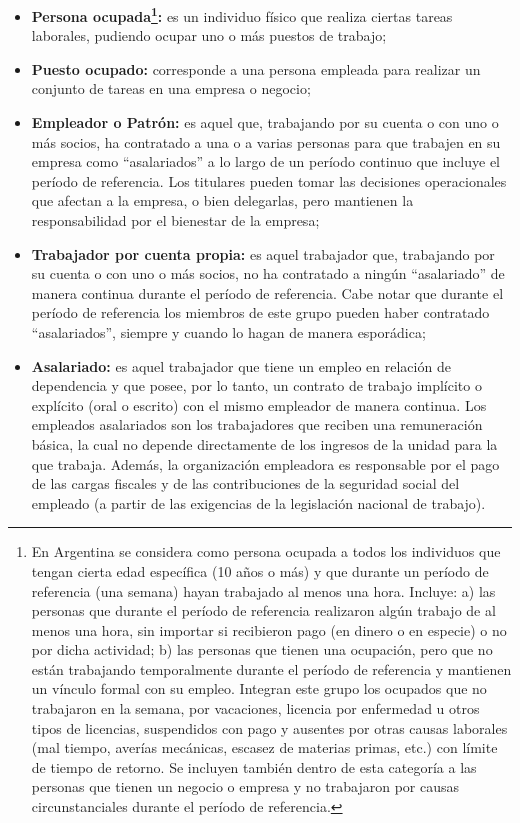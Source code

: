 \documentclass[
  openany]{book}
\begin{document}
\begin{itemize}
\item
  \textbf{Persona ocupada\footnote{En Argentina se considera como persona ocupada a todos los individuos que tengan cierta edad específica (10 años o más) y que durante un período de referencia (una semana) hayan trabajado al menos una hora. Incluye: a) las personas que durante el período de referencia realizaron algún trabajo de al menos una hora, sin importar si recibieron pago (en dinero o en especie) o no por dicha actividad; b) las personas que tienen una ocupación, pero que no están trabajando temporalmente durante el período de referencia y mantienen un vínculo formal con su empleo. Integran este grupo los ocupados que no trabajaron en la semana, por vacaciones, licencia por enfermedad u otros tipos de licencias, suspendidos con pago y ausentes por otras causas laborales (mal tiempo, averías mecánicas, escasez de materias primas, etc.) con límite de tiempo de retorno. Se incluyen también dentro de esta categoría a las personas que tienen un negocio o empresa y no trabajaron por causas circunstanciales durante el período de referencia.}:} es un individuo físico que realiza ciertas tareas laborales, pudiendo ocupar uno o más puestos de trabajo;
\item
  \textbf{Puesto ocupado:} corresponde a una persona empleada para realizar un conjunto de tareas en una empresa o negocio;
\item
  \textbf{Empleador o Patrón:} es aquel que, trabajando por su cuenta o con uno o más socios, ha contratado a una o a varias personas para que trabajen en su empresa como ``asalariados'' a lo largo de un período continuo que incluye el período de referencia. Los titulares pueden tomar las decisiones operacionales que afectan a la empresa, o bien delegarlas, pero mantienen la responsabilidad por el bienestar de la empresa;
\item
  \textbf{Trabajador por cuenta propia:} es aquel trabajador que, trabajando por su cuenta o con uno o más socios, no ha contratado a ningún ``asalariado'' de manera continua durante el período de referencia. Cabe notar que durante el período de referencia los miembros de este grupo pueden haber contratado ``asalariados'', siempre y cuando lo hagan de manera esporádica;
\item
  \textbf{Asalariado:} es aquel trabajador que tiene un empleo en relación de dependencia y que posee, por lo tanto, un contrato de trabajo implícito o explícito (oral o escrito) con el mismo empleador de manera continua. Los empleados asalariados son los trabajadores que reciben una remuneración básica, la cual no depende directamente de los ingresos de la unidad para la que trabaja. Además, la organización empleadora es responsable por el pago de las cargas fiscales y de las contribuciones de la seguridad social del empleado (a partir de las exigencias de la legislación nacional de trabajo).
\end{itemize}
\end{document}
